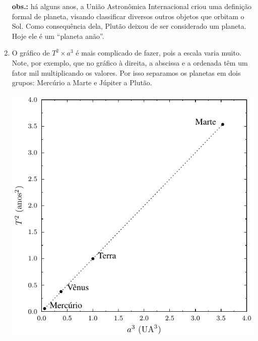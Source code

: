 \documentclass[a4paper]{article}
\begin{document}
\begin{resolucoes}
\begin{exercicio}
\begin{enumerate}
  \noindent
  \textbf{obs.:} há alguns anos, a União Astronômica Internacional criou uma definição formal de planeta, visando classificar diversos outros objetos que orbitam o Sol.
  Como consequência dela, Plutão deixou de ser considerado um planeta. Hoje ele é um ``planeta anão''.
  
  \item O gráfico de $T^2\times a^3$ é mais complicado de fazer, pois a escala varia muito.
  Note, por exemplo, que no gráfico à direita, a abscissa e a ordenada têm um fator mil multiplicando os valores.
  Por isso separamos os planetas em dois grupos: Mercúrio a Marte e Júpiter a Plutão.
  
  \noindent
  \begin{minipage}{0.45\textwidth}
    \includegraphics[width=\textwidth]{3a_lei_Kepler_Mercurio-Marte}
  \end{minipage}\hfill
  \begin{minipage}{0.45\textwidth}

\end{minipage}
\end{enumerate}
\end{exercicio}
\end{resolucoes}
\end{document}
